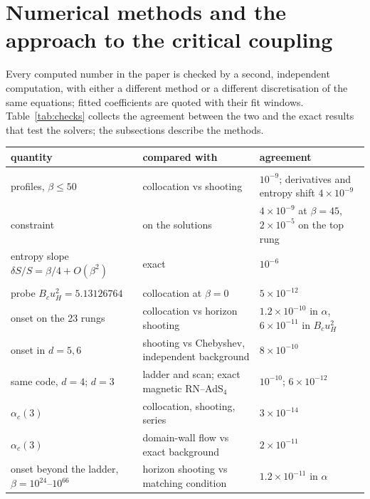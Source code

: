 \section{Numerical methods and the approach to the critical coupling}
\label{app:numerics}

Every computed number in the paper is checked by a second, independent
computation, with either a different method or a different discretisation
of the same equations; fitted coefficients are quoted with their fit
windows. Table~\ref{tab:checks} collects the agreement between the two and
the exact results that test the solvers; the subsections describe the
methods.

\begin{table}[p]
\centering
\footnotesize
\begin{tabular}{>{\raggedright\arraybackslash}p{}>{\raggedright\arraybackslash}p{}>{\raggedright\arraybackslash}p{}}
\toprule
quantity & compared with & agreement \\
\midrule
\multicolumn{3}{l}{\emph{brane} (\ref{app:numerics-brane})} \\
profiles, $\beta \le 50$ & collocation vs shooting & $10^{-9}$; derivatives and entropy shift $4\times10^{-9}$ \\
constraint & on the solutions & $4\times10^{-9}$ at $\beta = 45$, $2\times10^{-5}$ on the top rung \\
entropy slope $\delta S/S = \beta/4 + O(\beta^2)$ & exact & $10^{-6}$ \\
\midrule
\multicolumn{3}{l}{\emph{onset} (\ref{app:numerics-onset})} \\
probe $B_c u_H^2 = 5.13126764$ & collocation at $\beta = 0$ & $5\times10^{-12}$ \\
onset on the 23 rungs & collocation vs horizon shooting & $1.2\times10^{-10}$ in $\alpha$, $6\times10^{-11}$ in $B_c u_H^2$ \\
onset in $d = 5, 6$ & shooting vs Chebyshev, independent background & $8\times10^{-10}$ \\
same code, $d = 4$; $d = 3$ & ladder and scan; exact magnetic RN--AdS$_4$ & $10^{-10}$; $6\times10^{-12}$ \\
$\alpha_c(3)$ & collocation, shooting, series & $3\times10^{-14}$ \\
$\alpha_c(3)$ & domain-wall flow vs exact background & $2\times10^{-11}$ \\
onset beyond the ladder, $\beta = 10^{24}$--$10^{66}$ & horizon shooting vs matching condition & $1.2\times10^{-11}$ in $\alpha$ \\

\end{tabular}
\end{table}
